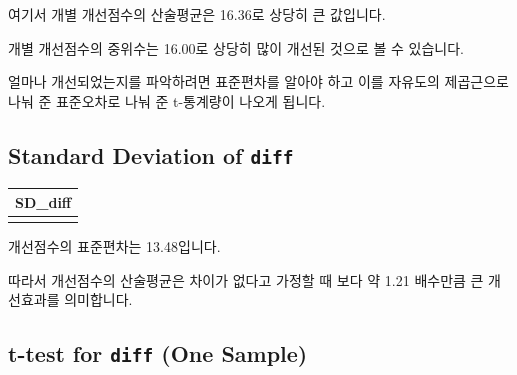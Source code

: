 \documentclass[
]{book}
\begin{document}
여기서 개별 개선점수의 산술평균은 16.36로 상당히 큰 값입니다.

개별 개선점수의 중위수는 16.00로 상당히 많이 개선된 것으로 볼 수 있습니다.

얼마나 개선되었는지를 파악하려면 표준편차를 알아야 하고 이를 자유도의 제곱근으로 나눠 준 표준오차로 나눠 준 t-통계량이 나오게 됩니다.

\subsection{\texorpdfstring{Standard Deviation of \texttt{diff}}{Standard Deviation of diff}}\label{standard-deviation-of-diff-1}

\begin{longtable}[]{@{}
  >{\raggedleft\arraybackslash}p{}@{}}
\toprule\noalign{}
\begin{minipage}[b]{\linewidth}\raggedleft
SD\_diff
\end{minipage} \\
\midrule\noalign{}
\endhead
\bottomrule\noalign{}
\endlastfoot
13.48 \\
\end{longtable}

개선점수의 표준편차는 13.48입니다.

따라서 개선점수의 산술평균은 차이가 없다고 가정할 때 보다 약 1.21 배수만큼 큰 개선효과를 의미합니다.

\subsection{\texorpdfstring{t-test for \texttt{diff} (One Sample)}{t-test for diff (One Sample)}}\label{t-test-for-diff-one-sample-1}
\end{document}
